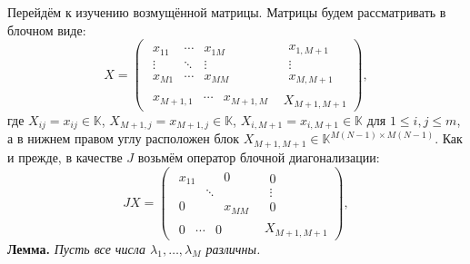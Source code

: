 Перейдём к изучению возмущённой матрицы.
Матрицы будем рассматривать в блочном виде:
\[
    X =
        \left(\begin{array}{c|c}
            \begin{matrix}
                x_{11} & \cdots & x_{1M} \\
                \vdots & \ddots & \vdots \\
                x_{M1} & \cdots & x_{MM}
            \end{matrix} &
            \begin{matrix}
                x_{1,M+1} \\
                \vdots \\
                x_{M,M+1}
            \end{matrix} \\ \hline
            \begin{matrix}
                x_{M+1,1} &
                \cdots &
                x_{M+1,M}
            \end{matrix} &
            X_{M+1,M+1}
        \end{array}\right),
    \]
где
\( X_{ij}      {=} x_{ij}      {\in} \mathbb{K} \),
\( X_{M{+}1,j} {=} x_{M{+}1,j} {\in} \mathbb{K} \),
\( X_{i,M{+}1} {=} x_{i,M{+}1} {\in} \mathbb{K} \)
для \( 1\leq i,j \leq m \),
а в нижнем правом углу расположен блок
\( X_{M{+}1,M{+}1} {\in} \mathbb{K}^{M(N{-}1){\times}M(N-1)} \).
Как и прежде, в качестве \( J \)
возьмём оператор блочной диагонализации:
\[
    J X =
        \left(\begin{array}{c|c}
            \begin{matrix}
                x_{11} &  & 0 \\
                 & \ddots &  \\
                0 &  & x_{MM}
            \end{matrix} &
            \begin{matrix}
                0 \\
                \vdots \\
                0
            \end{matrix} \\ \hline
            \begin{matrix}
                0 & \cdots & 0
            \end{matrix} &
            X_{M+1,M+1}
        \end{array}\right),
    \]
\begingroup
\textbf{Лемма.}\itshape
    Пусть все числа \( \lambda_1, \ldots, \lambda_M \) различны.
